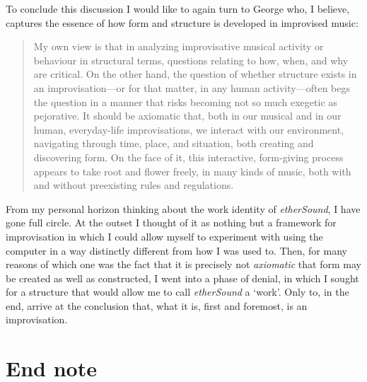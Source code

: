 To conclude this discussion I would like to again turn to George \citeauthor{lewis-1} who, I believe, captures the essence of how form and structure is developed in improvised music: 
\begin{quotation}   My own view is that in analyzing improvisative musical activity or   behaviour in structural terms, questions relating to how, when, and   why are critical. On the other hand, the question of whether   structure exists in an improvisation---or for that matter, in any   human activity---often begs the question in a manner that risks   becoming not so much exegetic as pejorative. It should be axiomatic   that, both in our musical and in our human, everyday-life   improvisations, we interact with our environment, navigating through   time, place, and situation, both creating and discovering form. On   the face of it, this interactive, form-giving process appears to   take root and flower freely, in many kinds of music, both with and   without preexisting rules and regulations.  \citep[p. 117]{lewis-1} 
\end{quotation} 
From my personal horizon thinking about the work identity of \emph{etherSound}, I have gone full circle. At the outset I thought of it as nothing but a framework for improvisation in which I could allow myself to experiment with using the computer in a way distinctly different from how I was used to. Then, for many reasons of which one was the fact that it is precisely not \emph{axiomatic} that form may be created as well as constructed, I went into a phase of denial, in which I sought for a structure that would allow me to call \emph{etherSound} a `work'. Only to, in the end, arrive at the conclusion that, what it is, first and foremost, is an improvisation. 


\section{End note}
\label{sec:endnote}


